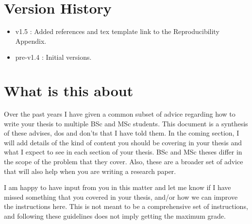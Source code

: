 \documentclass[11pt]{article}
\begin{document}
\newpage



% 
\tableofcontents
\newpage 
\section*{Version History}
\begin{itemize}
    \item v1.5     : Added references and tex template link to the Reproducibility Appendix. 
    \item pre-v1.4 : Initial versions. 
\end{itemize}

\newpage 
\section*{What is this about}
Over the past years I have given a common subset of advice regarding how to write your thesis to multiple BSc and MSc students. This document is a synthesis of these advises, dos and don'ts that I have told them. In the coming section, I will add details of the kind of content you should be covering in your thesis and what I expect to see in each section of your thesis. BSc and MSc theses differ in the scope of the problem that they cover. Also, these are a broader set of advice that will also help when you are writing a research paper. 


I am happy to have input from you in this matter and let me know if I have missed something that you covered in your thesis, and/or how we can improve the instructions here. This is not meant to be a comprehensive set of instructions, and following these guidelines does not imply getting the maximum grade. 
\end{document}
